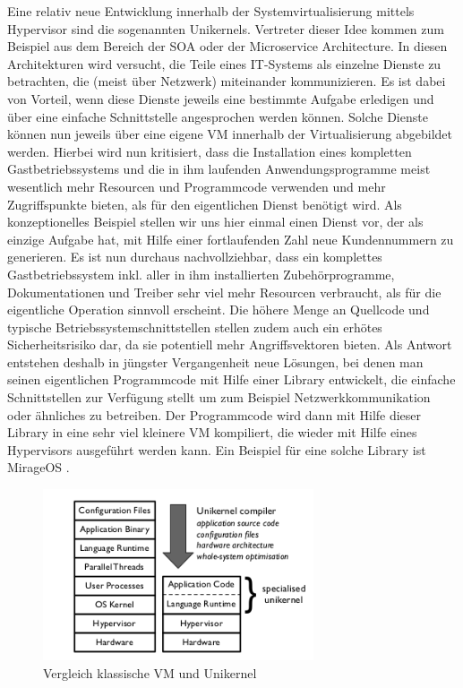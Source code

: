 Eine relativ neue Entwicklung innerhalb der Systemvirtualisierung mittels Hypervisor sind die sogenannten Unikernels. Vertreter dieser Idee kommen zum Beispiel aus dem Bereich der \ac{SOA} oder der Microservice Architecture. In diesen Architekturen wird versucht, die Teile eines IT-Systems als einzelne Dienste zu betrachten, die (meist über Netzwerk) miteinander kommunizieren. Es ist dabei von Vorteil, wenn diese Dienste jeweils eine bestimmte Aufgabe erledigen und über eine einfache Schnittstelle angesprochen werden können. Solche Dienste können nun jeweils über eine eigene \ac{VM} innerhalb der Virtualisierung abgebildet werden. Hierbei wird nun kritisiert, dass die Installation eines kompletten Gastbetriebssystems und die in ihm laufenden Anwendungsprogramme meist wesentlich mehr Resourcen und Programmcode verwenden und mehr Zugriffspunkte bieten, als für den eigentlichen Dienst benötigt wird. Als konzeptionelles Beispiel stellen wir uns hier einmal einen Dienst vor, der als einzige Aufgabe hat, mit Hilfe einer fortlaufenden Zahl neue Kundennummern zu generieren. Es ist nun durchaus nachvollziehbar, dass ein komplettes Gastbetriebssystem inkl. aller in ihm installierten Zubehörprogramme, Dokumentationen und Treiber sehr viel mehr Resourcen verbraucht, als für die eigentliche Operation sinnvoll erscheint. Die höhere Menge an Quellcode und typische Betriebssystemschnittstellen stellen zudem auch ein erhötes Sicherheitsrisiko dar, da sie potentiell mehr Angriffsvektoren bieten. Als Antwort entstehen deshalb in jüngster Vergangenheit neue Lösungen, bei denen man seinen eigentlichen Programmcode mit Hilfe einer Library entwickelt, die einfache Schnittstellen zur Verfügung stellt um zum Beispiel Netzwerkkommunikation oder ähnliches zu betreiben. Der Programmcode wird dann mit Hilfe dieser Library in eine sehr viel kleinere \ac{VM} kompiliert, die wieder mit Hilfe eines Hypervisors ausgeführt werden kann. Ein Beispiel für eine solche Library ist MirageOS \citep[Vgl.][]{MadMorAnd13}.

\begin{figure}[!ht]
  \begin{center}
    \includegraphics[width=8cm]{bilder/comparison-vm-unikernel.png}
    \caption{Vergleich klassische VM und Unikernel \citep[Abb. 1]{MadMorAnd13}}
  \end{center}
\end{figure}

